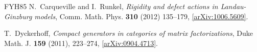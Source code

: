 \documentclass{compositio}
\theoremstyle{definition}
\numberwithin{equation}{section}
\begin{document}
\begin{thebibliography}{FYH{\etalchar{+}}85}
N.~Carqueville and I.~Runkel, \emph{Rigidity and defect actions in
  Landau-Ginzburg models}, Comm. Math. Phys. \textbf{310} (2012) 135--179, 
  \href{http://arxiv.org/abs/1006.5609}{[arXiv:1006.5609]}.

%
%
%
%
%  
T.~Dyckerhoff, \emph{Compact generators in categories of matrix factorizations},
  Duke Math. J. \textbf{159} (2011), 223--274,
  \href{http://arxiv.org/abs/0904.4713}{[arXiv:0904.4713]}.


\end{thebibliography}
\end{document}
